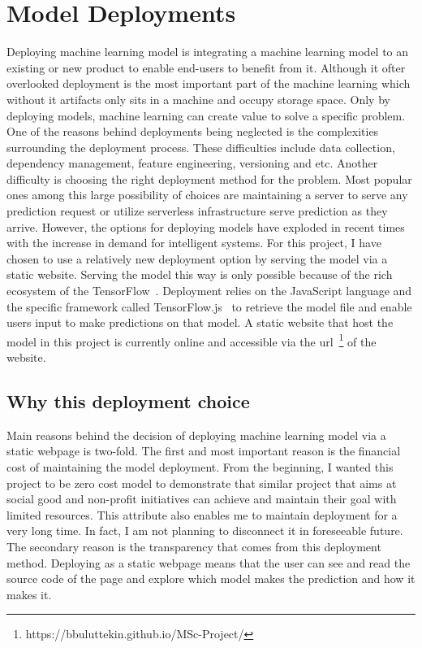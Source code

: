 \chapter{Model Deployments} \label{chap:deployment}
Deploying machine learning model is integrating a machine learning model to an existing or new product to enable end-users to benefit from it.
Although it ofter overlooked deployment is the most important part of the machine learning which without it artifacts only sits in a machine and occupy storage space.
Only by deploying models, machine learning can create value to solve a specific problem.
One of the reasons behind deployments being neglected is the complexities surrounding the deployment process.
These difficulties include data collection, dependency management, feature engineering, versioning and etc.
Another difficulty is choosing the right deployment method for the problem.
Most popular ones among this large possibility of choices are maintaining a server to serve any prediction request or utilize serverless infrastructure serve prediction as they arrive.
However, the options for deploying models have exploded in recent times with the increase in demand for intelligent systems.
For this project, I have chosen to use a relatively new deployment option by serving the model via a static website.
Serving the model this way is only possible because of the rich ecosystem of the TensorFlow~\cite{tensorflow}.
Deployment relies on the JavaScript language and the specific framework called TensorFlow.js~\cite{tensorjs} to retrieve the model file and enable users input to make predictions on that model.
A static website that host the model in this project is currently online and accessible via the url~\footnote{https://bbuluttekin.github.io/MSc-Project/} of the website.

\section{Why this deployment choice} \label{sec:whythisdeploy}
Main reasons behind the decision of deploying machine learning model via a static webpage is two-fold.
The first and most important reason is the financial cost of maintaining the model deployment.
From the beginning, I wanted this project to be zero cost model to demonstrate that similar project that aims at social good and non-profit initiatives can achieve and maintain their goal with limited resources.
This attribute also enables me to maintain deployment for a very long time.
In fact, I am not planning to disconnect it in foreseeable future. 
The secondary reason is the transparency that comes from this deployment method.
Deploying as a static webpage means that the user can see and read the source code of the page and explore which model makes the prediction and how it makes it.

